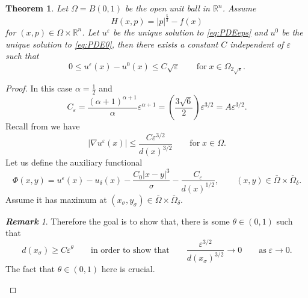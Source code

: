 \documentclass[11pt,reqno]{amsart}
\numberwithin{figure}{section}
\theoremstyle{plain}
\newtheorem{thm}{Theorem}[section]
\theoremstyle{remark}
\newtheorem{rem}{\bf{Remark}}
\numberwithin{equation}{section}
\begin{document}
\begin{thm}\label{thm:rate_doubling1} Let $\Omega = B(0,1)$ be the open unit ball in $\mathbb{R}^n$. Assume
\begin{equation*}
    H(x,p) = |p|^{\frac{5}{3}} - f(x)
\end{equation*}
for $(x,p)\in \Omega\times\mathbb{R}^n$. Let $u^\varepsilon$ be the unique solution to \eqref{eq:PDEeps} and $u^0$ be the unique solution to \eqref{eq:PDE0}, then there exists a constant $C$ independent of $\varepsilon$ such that
\begin{equation*}
    0\leq u^\varepsilon(x) - u^0(x) \leq C\sqrt{\varepsilon} \qquad\text{for}\;x\in \Omega_{2\sqrt{\varepsilon}}.
\end{equation*}
\end{thm}
\begin{proof} In this case $\alpha = \frac{1}{2}$ and 
\begin{equation*}
    C_\varepsilon = \frac{(\alpha+1)^{\alpha+1}}{\alpha}\varepsilon^{\alpha+1} = \left(\frac{3\sqrt{6}}{2}\right)\varepsilon^{3/2} = A\varepsilon^{3/2}.
\end{equation*}
Recall from \cite{alessio_asymptotic_2006} we have
\begin{equation*}
|\nabla u^\varepsilon(x)|  \leq \frac{C\varepsilon^{3/2}}{d(x)^{3/2}} \qquad\text{for}\;x\in \Omega.
\end{equation*}
Let us define the auxiliary functional
\begin{equation*}
    \Phi(x,y) = u^\varepsilon(x) - u_\delta(x) -\frac{C_0|x-y|^3}{\sigma} - \frac{C_\varepsilon}{d(x)^{1/2}}, \qquad (x,y)\in \overline{\Omega}\times \overline{\Omega}_\delta.
\end{equation*}
Assume it has maximum at $(x_\sigma,y_\sigma)\in \overline{\Omega}\times \overline{\Omega}_\delta$. 

\begin{rem} \color{blue} Therefore the goal is to show that, there is some $\theta\in (0,1)$ such that
\begin{equation*}
    d(x_\sigma)\geq C\varepsilon^\theta \qquad\text{in order to show that}\qquad \frac{\varepsilon^{3/2}}{d(x_\sigma)^{3/2}} \rightarrow 0 \qquad\text{as}\;\varepsilon\to 0.
\end{equation*}
The fact that $\theta \in (0,1)$ here is crucial.
\color{black}
\end{rem}
\noindent 



\end{proof}
\end{document}

